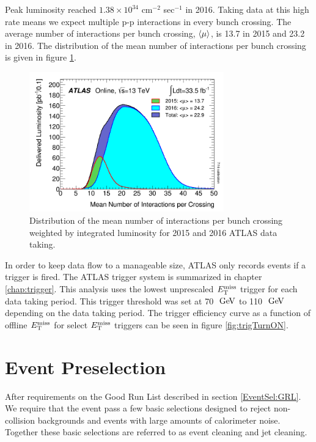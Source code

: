 \indent Peak luminosity reached $1.38 \times 10^{34}$  cm$^{-2}$ sec$^{-1}$ in 2016.  Taking data at this high rate means we expect multiple p-p interactions in every bunch crossing.  The average number of interactions per bunch crossing, $\braket{\mu}$, is 13.7 in 2015 and 23.2 in 2016.  The distribution of the mean number of interactions per bunch crossing is given in figure \ref{fig:nVtx}.   \\

\begin{figure}[htb]
  \begin{center}
    \includegraphics[width=0.75\textwidth]{figures/Data/mu_2015_2016_LHCC.png}\hspace{0.05\textwidth}
\end{center}
\caption{Distribution of the mean number of interactions per bunch crossing weighted by integrated luminosity for 2015 and 2016 ATLAS data taking.    }
\label{fig:nVtx} 
\end{figure}

\indent In order to keep data flow to a manageable size, ATLAS only records events if a trigger is fired.  The ATLAS trigger system is summarized in chapter \ref{chap:trigger}.  This analysis uses the lowest unprescaled $E_{\mathrm{T}}^{\mathrm{miss}}$ trigger for each data taking period.  This trigger threshold was set at 70 $\gev$ to 110 $\gev$ depending on the data taking period. The trigger efficiency curve as a function of offline $E_{\mathrm{T}}^{\mathrm{miss}}$ for select $E_{\mathrm{T}}^{\mathrm{miss}}$ triggers can be seen in figure \ref{fig:trigTurnON}. \\

\chapter{Event Preselection}
\label{chap:Selection_EventPreselection}

\indent After requirements on the Good Run List described in section \ref{EventSel:GRL}.  We require that the event pass a few basic selections designed to reject non-collision backgrounds and events with large amounts of calorimeter noise.  Together these basic selections are referred to as event cleaning and jet cleaning.  \\ %


